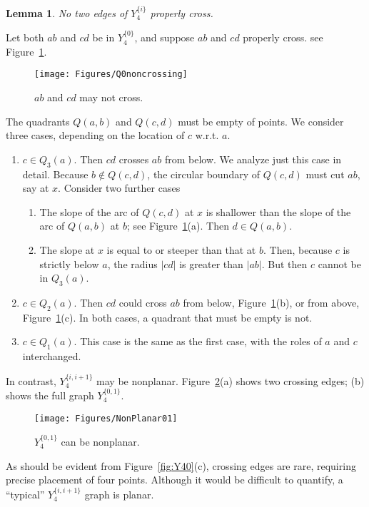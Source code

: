 \pdfoutput=1  \documentclass[]{article}
\newcommand{\ABox}{
\raisebox{3pt}{\framebox[6pt]{\rule{6pt}{0pt}}}
}
\newenvironment{proof}{{\bf Proof:}}{\hfill\ABox}
\newtheorem{lemma}[theorem]{Lemma}
\newcommand{\figlab}[1]{\label{fig:#1}}
\newcommand{\figref}[1]{\ref{fig:#1}}
\begin{document}
\begin{lemma}
No two edges of $Y_4^{\{i\}}$ properly cross.
\end{lemma}
\begin{proof}
Let both $ab$ and $cd$ be in $Y_4^{\{0\}}$, and suppose $ab$ and $cd$ properly cross.
see Figure~\figref{Q0noncrossing}.
\begin{figure}[htbp]
\centering
\texttt{[image: Figures/Q0noncrossing]}
\caption{$ab$ and $cd$ may not cross.}
\figlab{Q0noncrossing}
\end{figure}
The quadrants $Q(a,b)$ and $Q(c,d)$ must be empty of points.
We consider three cases, depending on the location of $c$ w.r.t. $a$.
\begin{enumerate}
\item $c \in Q_3(a)$.
Then $cd$ crosses $ab$ from below.  We analyze just this case in detail.
Because $b \not\in Q(c,d)$, the circular boundary of $Q(c,d)$ must cut $ab$,
say at $x$.  Consider two further cases
\begin{enumerate}
\item The slope of the arc of $Q(c,d)$ at $x$ is shallower than the slope of the
arc of $Q(a,b)$ at $b$; see Figure~\figref{Q0noncrossing}(a).
Then $d \in Q(a,b)$.
\item The slope at $x$ is equal to or steeper than that at $b$.
Then, because $c$ is strictly below $a$, the radius $|cd|$ is greater than
$|ab|$.
But then $c$ cannot be in $Q_3(a)$.
\end{enumerate}
\item $c \in Q_2(a)$.
Then $cd$ could cross $ab$ from below, Figure~\figref{Q0noncrossing}(b),
or from above, Figure~\figref{Q0noncrossing}(c).
In both cases, a quadrant that must be empty is not.
\item $c \in Q_1(a)$.
This case is the same as the first case, with the roles of $a$ and $c$ interchanged.
\end{enumerate}
\end{proof}

In contrast, $Y_4^{\{i,i+1\}}$ may be nonplanar.
Figure~\figref{NonPlanar01}(a) shows two crossing edges;
(b) shows the full graph $Y_4^{\{0,1\}}$.
\begin{figure}[htbp]
\centering
\texttt{[image: Figures/NonPlanar01]}
\caption{$Y_4^{\{0,1\}}$ can be nonplanar.}
\figlab{NonPlanar01}
\end{figure}


As should be evident from Figure~\figref{Y40}(c),
crossing edges are rare, requiring precise placement of four points.
Although it would be difficult to quantify, a ``typical'' $Y_4^{\{i,i+1\}}$ graph
is planar.
\end{document}

